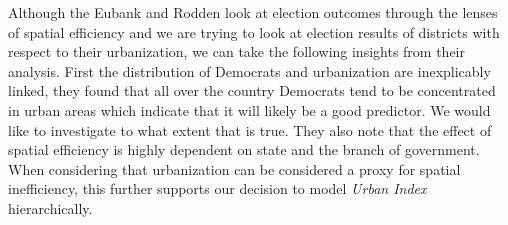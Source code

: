 \documentclass[12pt]{article}
\newcommand{\red}[1]{\textcolor{red}{#1}}
\newcommand{\blue}[1]{\textcolor{blue}{#1}}
\begin{document}
Although the Eubank and Rodden look at election outcomes through the lenses of spatial efficiency and we are trying to look at election results of districts with respect to their urbanization, we can take the following insights from their analysis. First the distribution of Democrats and urbanization are inexplicably linked, they found that all over the country Democrats tend to be concentrated in urban areas which indicate that it will likely be a good predictor. We would like to investigate to what extent that is true. They also note that the effect of spatial efficiency is highly dependent on state and the branch of government. When considering that urbanization can be considered a proxy for spatial inefficiency, this further supports our decision to model \textit{Urban Index} hierarchically. 










\end{document}
